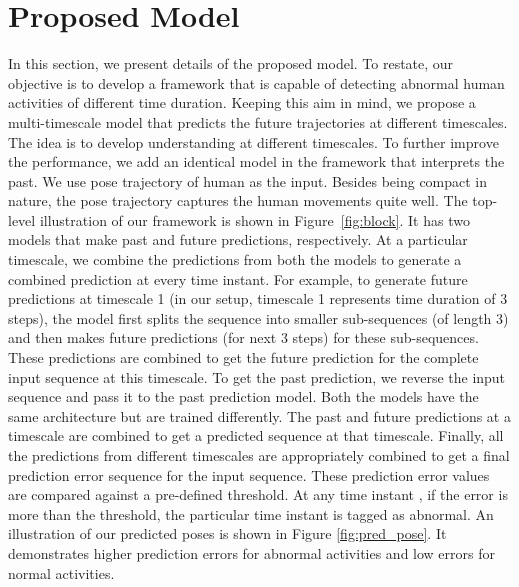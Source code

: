\documentclass[conference]{IEEEtran}
\begin{document}
\section{Proposed Model}
\label{model}
In this section, we present details of the proposed model. To restate, our objective is to develop a framework that is capable of detecting abnormal human activities of different time duration. Keeping this aim in mind, we propose a multi-timescale model that predicts the future trajectories at different timescales. The idea is to develop understanding at different timescales. To further improve the performance, we add an identical model in the framework that interprets the past. We use pose trajectory of human as the input. Besides being compact in nature, the pose trajectory captures the human movements quite well. The top-level illustration of our framework is shown in Figure~\ref{fig:block}. It has two models that make past and future predictions, respectively. At a particular timescale, we combine the predictions from both the models to generate a combined prediction at every time instant. For example, to generate future predictions at timescale 1 (in our setup, timescale 1 represents time duration of 3 steps), the model first splits the sequence into smaller sub-sequences (of length 3) and then makes future predictions (for next 3 steps) for these sub-sequences. These predictions are combined to get the future prediction for the complete input sequence at this timescale. To get the past prediction, we reverse the input sequence and pass it to the past prediction model. Both the models have the same architecture but are trained differently. The past and future predictions at a timescale are combined to get a predicted sequence at that timescale. Finally, all the predictions from different timescales are appropriately combined to get a final prediction error sequence for the input sequence. These prediction error values are compared against a pre-defined threshold. At any time instant , if the error is more than the threshold, the particular time instant is tagged as abnormal. An illustration of our predicted poses is shown in Figure \ref{fig:pred_pose}. It demonstrates higher prediction errors for abnormal activities and low errors for normal activities.

\begin{figure*}
    \centering
\caption{An illustration of predicted poses from the proposed model. The first scene has a \textit{walking} action while the other three have abnormal actions. The \textit{green} and \textit{blue} poses represent the actual and predicted poses, respectively. The model generate large prediction errors for the abnormal poses.}
    \label{fig:pred_pose}
\end{figure*}
\end{document}
